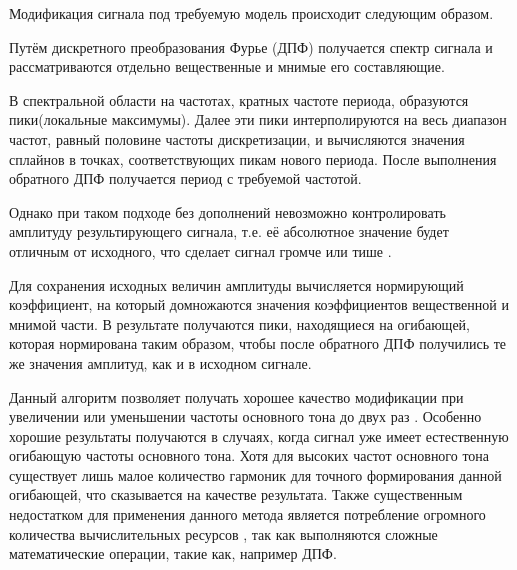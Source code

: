 Модификация сигнала под требуемую модель происходит следующим образом.

Путём дискретного преобразования Фурье (ДПФ) получается спектр сигнала и рассматриваются отдельно вещественные и мнимые его составляющие.

В спектральной области на частотах, кратных частоте периода, образуются пики(локальные максимумы). Далее эти пики интерполируются на весь диапазон частот, равный половине частоты дискретизации, и вычисляются значения сплайнов в точках, соответствующих пикам нового периода. После выполнения обратного ДПФ получается период с требуемой частотой.

Однако при таком подходе без дополнений невозможно контролировать амплитуду результирующего сигнала, т.е. её абсолютное значение будет отличным от исходного, что сделает сигнал громче или тише \cite{furie}.

Для сохранения исходных величин амплитуды вычисляется нормирующий коэффициент, на который домножаются значения коэффициентов вещественной и мнимой части. В результате получаются пики, находящиеся на огибающей, которая нормирована таким образом, чтобы после обратного ДПФ получились те же значения амплитуд, как и в исходном сигнале.

Данный алгоритм позволяет получать хорошее качество модификации при увеличении или уменьшении частоты основного тона до двух раз \cite{mod_algo}. Особенно хорошие результаты получаются в случаях, когда сигнал уже имеет естественную огибающую частоты основного тона. Хотя для высоких частот основного тона существует лишь малое количество гармоник для точного формирования данной огибающей, что сказывается на качестве результата. Также существенным недостатком для применения данного метода является потребление огромного количества вычислительных ресурсов \cite{mod_algo}, так как выполняются сложные математические операции, такие как, например ДПФ.

